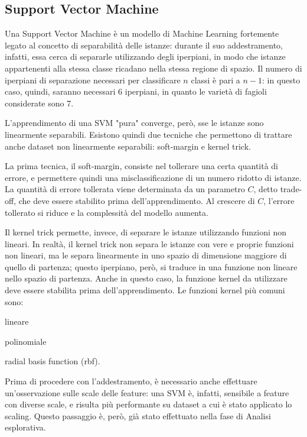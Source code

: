 \subsection{Support Vector Machine}
Una Support Vector Machine è un modello di Machine Learning fortemente legato
al concetto di separabilità delle istanze: durante il suo addestramento, infatti,
essa cerca di separarle utilizzando degli iperpiani, in modo che istanze
appartenenti alla stessa classe ricadano nella stessa regione di spazio. 
Il numero di iperpiani di separazione necessari per classificare $n$ classi
è pari a $n-1$: in questo caso, quindi, saranno necessari 6 iperpiani, in quanto
le varietà di fagioli considerate sono 7.

L'apprendimento di una SVM "pura" converge, però, sse le istanze
sono linearmente separabili.
Esistono quindi due tecniche che permettono di trattare anche dataset non linearmente
separabili: soft-margin e kernel trick.

La prima tecnica, il soft-margin, consiste nel tollerare una certa quantità di
errore, e permettere quindi una misclassificazione di un numero ridotto di
istanze. La quantità di errore tollerata viene determinata da un parametro $C$,
detto trade-off, che deve essere stabilito prima dell'apprendimento.
Al crescere di $C$, l'errore tollerato si riduce e la complessità del modello
aumenta.

Il kernel trick permette, invece, di separare le istanze utilizzando funzioni non
lineari. In realtà, il kernel trick non separa le istanze con vere e proprie
funzioni non lineari, ma le separa linearmente in uno spazio di dimensione
maggiore di quello di partenza; questo 
iperpiano, però, si traduce in una funzione non lineare nello spazio di partenza.
Anche in questo caso, la funzione kernel da utilizzare deve essere stabilita prima dell'apprendimento.
Le funzioni kernel più comuni sono: \begin{itemize*}
    \item lineare
    \item polinomiale
    \item radial basis function (rbf).
\end{itemize*}

Prima di procedere con l'addestramento, è necessario anche effettuare un'osservazione
sulle scale delle feature: una SVM è, infatti, sensibile a feature con diverse scale,
e risulta più performante su dataset a cui è stato applicato lo scaling.
Questo passaggio è, però, già stato effettuato nella fase di Analisi esplorativa.

